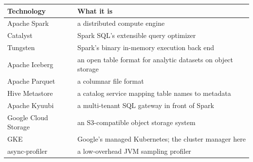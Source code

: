 \begin{table}[H]
\centering
\footnotesize
\renewcommand{\arraystretch}{0.9}
\begin{tabular}{@{}p{3.6cm}p{10.1cm}@{}}
\toprule
\textbf{Technology} & \textbf{What it is} \\
\midrule
Apache Spark & a distributed compute engine \\
Catalyst & Spark SQL's extensible query optimizer \\
Tungsten & Spark's binary in-memory execution back end \\
Apache Iceberg & an open table format for analytic datasets on object storage \\
Apache Parquet & a columnar file format \\
Hive Metastore & a catalog service mapping table names to metadata \\
Apache Kyuubi & a multi-tenant SQL gateway in front of Spark \\
Google Cloud Storage & an S3-compatible object storage system \\
GKE & Google's managed Kubernetes; the cluster manager here \\
async-profiler & a low-overhead JVM sampling profiler \\
\bottomrule
\end{tabular}
\end{table}

\clearpage
